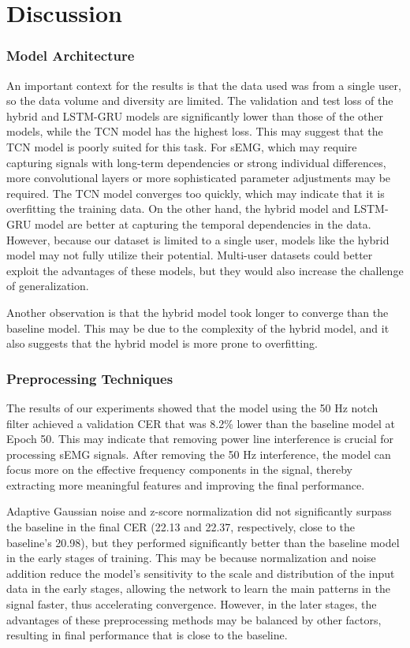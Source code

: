 \section{Discussion}

\subsubsection{Model Architecture}
An important context for the results is that the data used was from a single user, so the data volume and diversity are limited. The validation and test loss of the hybrid and LSTM-GRU models are significantly lower than those of the other models, while the TCN model has the highest loss. This may suggest that the TCN model is poorly suited for this task. For sEMG, which may require capturing signals with long-term dependencies or strong individual differences, more convolutional layers or more sophisticated parameter adjustments may be required. The TCN model converges too quickly, which may indicate that it is overfitting the training data. On the other hand, the hybrid model and LSTM-GRU model are better at capturing the temporal dependencies in the data. However, because our dataset is limited to a single user, models like the hybrid model may not fully utilize their potential. Multi-user datasets could better exploit the advantages of these models, but they would also increase the challenge of generalization.

Another observation is that the hybrid model took longer to converge than the baseline model. This may be due to the complexity of the hybrid model, and it also suggests that the hybrid model is more prone to overfitting.

\subsubsection{Preprocessing Techniques}
The results of our experiments showed that the model using the 50 Hz notch filter achieved a validation CER that was 8.2\% lower than the baseline model at Epoch 50. This may indicate that removing power line interference is crucial for processing sEMG signals. After removing the 50 Hz interference, the model can focus more on the effective frequency components in the signal, thereby extracting more meaningful features and improving the final performance.

Adaptive Gaussian noise and z-score normalization did not significantly surpass the baseline in the final CER (22.13 and 22.37, respectively, close to the baseline's 20.98), but they performed significantly better than the baseline model in the early stages of training. This may be because normalization and noise addition reduce the model's sensitivity to the scale and distribution of the input data in the early stages, allowing the network to learn the main patterns in the signal faster, thus accelerating convergence. However, in the later stages, the advantages of these preprocessing methods may be balanced by other factors, resulting in final performance that is close to the baseline.

